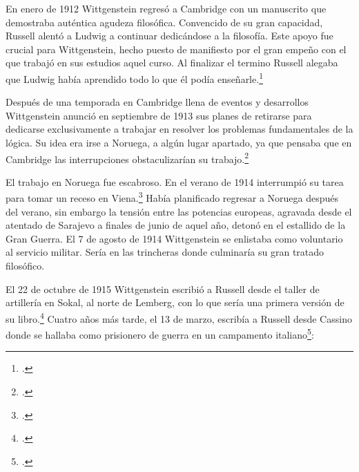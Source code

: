       En enero de 1912 Wittgenstein regresó a Cambridge con un manuscrito que
      demostraba auténtica agudeza filosófica. Convencido de su gran capacidad,
      Russell alentó a Ludwig a continuar dedicándose a la filosofía. Este apoyo fue
      crucial para Wittgenstein, hecho puesto de manifiesto por el gran empeño con el
      que trabajó en sus estudios aquel curso. Al finalizar el termino Russell alegaba
      que Ludwig había aprendido todo lo que él podía enseñarle.\footcite[cap. 3 loc
      865]{monk}

      Después de una temporada en Cambridge llena de eventos y desarrollos
      Wittgenstein anunció en septiembre de 1913 sus planes de retirarse para
      dedicarse exclusivamente a trabajar en resolver los problemas fundamentales de
      la lógica. Su idea era irse a Noruega, a algún lugar apartado, ya que pensaba
      que en Cambridge las interrupciones obstaculizarían su trabajo.\footcite[cap. 4
      loc 1844]{monk}

       El trabajo en Noruega fue escabroso.
      En el verano de 1914 interrumpió su tarea para tomar un receso en
      Viena.\footcite[cap. 5 loc 2154]{monk} Había planificado regresar a Noruega
      después del verano, sin embargo la tensión entre las potencias europeas,
      agravada desde el atentado de Sarajevo a finales de junio de aquel año, detonó
      en el estallido de la Gran Guerra. El 7 de agosto de 1914 Wittgenstein se
      enlistaba como voluntario al servicio militar. Sería en las trincheras donde
      culminaría su gran tratado filosófico.

      El 22 de octubre de 1915 Wittgenstein escribió a Russell desde el taller de
      artillería en Sokal, al norte de Lemberg, con lo que sería una primera versión
      de su libro.\footcite[cf. p.84]{cambridgeletters} Cuatro años más tarde, el 13
      de marzo, escribía a Russell desde Cassino donde se hallaba como prisionero de
      guerra en un campamento italiano\footcite[cf. p.268]{mcguinness}: 

